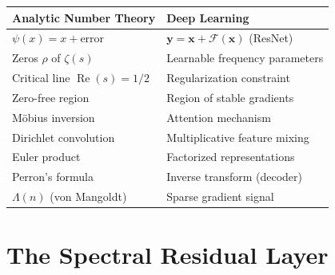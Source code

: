 \begin{center}
  \renewcommand{\arraystretch}{1.4}
  \begin{tabular}{|l|l|}
    \hline
    \textbf{Analytic Number Theory}            & \textbf{Deep Learning}                                       \\
    \hline
    $\psi(x) = x + \text{error}$               & $\mathbf{y} = \mathbf{x} + \mathcal{F}(\mathbf{x})$ (ResNet) \\
    Zeros $\rho$ of $\zeta(s)$                 & Learnable frequency parameters                               \\
    Critical line $\operatorname{Re}(s) = 1/2$ & Regularization constraint                                    \\
    Zero-free region                           & Region of stable gradients                                   \\
    M\"obius inversion                         & Attention mechanism                                          \\
    Dirichlet convolution                      & Multiplicative feature mixing                                \\
    Euler product                              & Factorized representations                                   \\
    Perron's formula                           & Inverse transform (decoder)                                  \\
    $\Lambda(n)$ (von Mangoldt)                & Sparse gradient signal                                       \\
    \hline
  \end{tabular}
\end{center}

\section{The Spectral Residual Layer}

